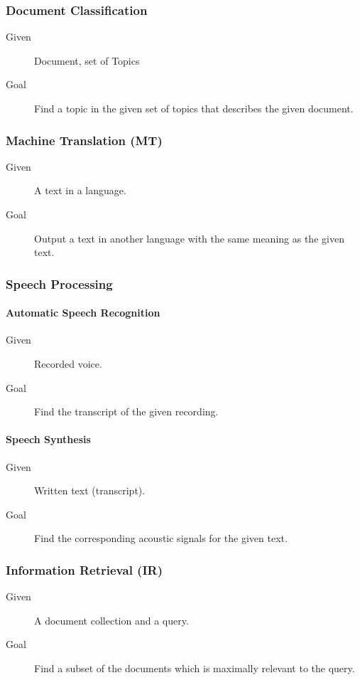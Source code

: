 			\subsubsection{Document Classification} %
				\begin{description}
					\item[Given] Document, set of Topics
					\item[Goal] Find a topic in the given set of topics that describes the given document.
				\end{description}

			\subsubsection{Machine Translation (MT)} %
				\begin{description}
					\item[Given] A text in a language.
					\item[Goal] Output a text in another language with the same meaning as the given text.
				\end{description}

			\subsubsection{Speech Processing} %
				\paragraph{Automatic Speech Recognition}
					\begin{description}
						\item[Given] Recorded voice.
						\item[Goal] Find the transcript of the given recording.
					\end{description}

				\paragraph{Speech Synthesis}
					\begin{description}
						\item[Given] Written text (transcript).
						\item[Goal] Find the corresponding acoustic signals for the given text.
					\end{description}

			\subsubsection{Information Retrieval (IR)} %
				\begin{description}
					\item[Given] A document collection and a query.
					\item[Goal] Find a subset of the documents which is maximally relevant to the query.
				\end{description}

